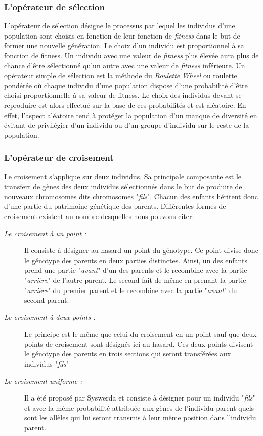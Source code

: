 		\subsubsection{L’opérateur de sélection}
		L'opérateur de sélection désigne le processus par lequel les individus d'une population sont choisis en fonction de leur fonction de \emph{fitness} dans le but de former une nouvelle génération. Le choix d'un individu est proportionnel à sa fonction de fitness. Un individu avec une valeur de \emph{fitness} plus élevée aura plus de chance d’être sélectionné qu’un autre avec une valeur de \emph{fitness} inférieure. Un opérateur simple de sélection est la méthode du \emph{Roulette Wheel} ou roulette pondérée où chaque individu d’une population dispose d'une probabilité d'être choisi proportionnelle à sa valeur de fitness. Le choix des individus devant se reproduire est alors effectué sur la base de ces probabilités et est aléatoire. En effet, l'aspect aléatoire tend à protéger la population d'un manque de diversité en évitant de privilégier d'un individu ou d'un groupe d'individu sur le reste de la population.
		
	\subsubsection{L’opérateur de croisement}
	Le croisement s'applique sur deux individus. Sa principale composante est le transfert de gènes des deux individus sélectionnés dans le but de produire de nouveaux chromosomes dits chromosomes "\emph{fils}". Chacun des enfants héritent donc d'une partie du patrimoine génétique des parents. Différentes formes de croisement existent au nombre desquelles nous pouvons citer:
	\begin{description}
		\item[\textsl{Le croisement à un point :}] Il consiste à désigner au hasard un point du génotype. Ce point divise donc le génotype des parents en deux parties distinctes. Ainsi, un des enfants prend une partie "\emph{avant}" d'un des parents et le recombine avec la partie "\emph{arrière}" de l'autre parent. Le second fait de même en prenant la partie "\emph{arrière}" du premier parent et le recombine avec la partie "\emph{avant}" du second parent.
		
		\item[\textsl{Le croisement à deux points :}] Le principe est le même que celui du croisement en un point sauf que deux points de croisement sont désignés ici au hasard. Ces deux points divisent le génotype des parents en trois sections qui seront transférées aux individus "\emph{fils}"
	
		\item[\textsl{Le croisement uniforme :}] Il a été proposé par Syswerda \cite{Syswerda} et consiste à désigner pour un individu "\emph{fils}" et avec la même probabilité attribuée aux gènes de l'individu parent quels sont les allèles qui lui seront transmis à leur même position dans l'individu parent.
	
	\end{description}
	
